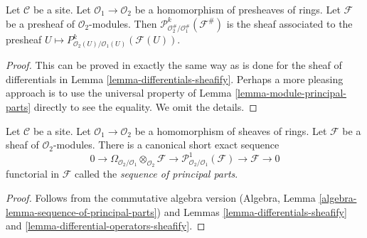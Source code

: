 \begin{lemma}
\label{lemma-differential-operators-sheafify}
Let $\mathcal{C}$ be a site. Let $\mathcal{O}_1 \to \mathcal{O}_2$
be a homomorphism of presheaves of rings. Let $\mathcal{F}$ be a presheaf
of $\mathcal{O}_2$-modules. Then
$\mathcal{P}^k_{\mathcal{O}_2^\#/\mathcal{O}_1^\#}(\mathcal{F}^\#)$
is the sheaf associated to the presheaf
$U \mapsto P^k_{\mathcal{O}_2(U)/\mathcal{O}_1(U)}(\mathcal{F}(U))$.
\end{lemma}

\begin{proof}
This can be proved in exactly the same way as is done for the sheaf
of differentials in Lemma \ref{lemma-differentials-sheafify}.
Perhaps a more pleasing approach is to use the universal property
of Lemma \ref{lemma-module-principal-parts} directly to see the equality.
We omit the details.
\end{proof}

\begin{lemma}
\label{lemma-sequence-of-principal-parts}
Let $\mathcal{C}$ be a site. Let $\mathcal{O}_1 \to \mathcal{O}_2$
be a homomorphism of sheaves of rings. Let $\mathcal{F}$ be a sheaf
of $\mathcal{O}_2$-modules. There is a
canonical short exact sequence
$$
0 \to
\Omega_{\mathcal{O}_2/\mathcal{O}_1} \otimes_{\mathcal{O}_2} \mathcal{F} \to
\mathcal{P}^1_{\mathcal{O}_2/\mathcal{O}_1}(\mathcal{F}) \to
\mathcal{F} \to 0
$$
functorial in $\mathcal{F}$ called the {\it sequence of principal parts}.
\end{lemma}

\begin{proof}
Follows from the commutative algebra version
(Algebra, Lemma \ref{algebra-lemma-sequence-of-principal-parts})
and Lemmas \ref{lemma-differentials-sheafify} and
\ref{lemma-differential-operators-sheafify}.
\end{proof}

